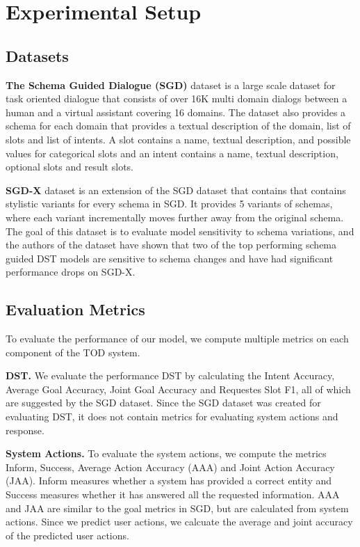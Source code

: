 
\section{Experimental Setup}

\subsection{Datasets}

\textbf{The Schema Guided Dialogue (SGD)} dataset is a large scale dataset for task oriented dialogue that consists of over 16K multi domain
dialogs between a human and a virtual assistant covering 16 domains. The dataset also provides a schema for each domain that
provides a textual description of the domain, list of slots and list of intents. A slot contains a name, textual description,
and possible values for categorical slots and an intent contains a name, textual description, optional slots and result slots.

\textbf{SGD-X} dataset is an extension of the SGD dataset that contains that contains stylistic variants for every schema in SGD.
It provides 5 variants of schemas, where each variant incrementally moves further away from the original schema.
The goal of this dataset is to evaluate model sensitivity to schema variations,
and the authors of the dataset have shown that two of the top performing schema guided DST models are sensitive to schema changes and have had significant performance drops on SGD-X.

\subsection{Evaluation Metrics}

To evaluate the performance of our model, we compute multiple metrics on each component of the TOD system.

\textbf{DST.} We evaluate the performance DST by calculating the Intent Accuracy, Average Goal Accuracy, Joint Goal Accuracy and Requestes Slot F1, all of which
are suggested by the SGD dataset. Since the SGD dataset was created for evaluating DST, it does not contain metrics for evaluating system
actions and response.

\textbf{System Actions.} To evaluate the system actions, we compute the metrics Inform, Success, Average Action Accuracy (AAA) and Joint Action Accuracy (JAA).
Inform measures whether a system has provided a correct entity and Success measures whether it has answered all the requested
information. AAA and JAA are similar to the goal metrics in SGD, but are calculated from system actions. Since we predict user actions, we calcuate the
average and joint accuracy of the predicted user actions.

